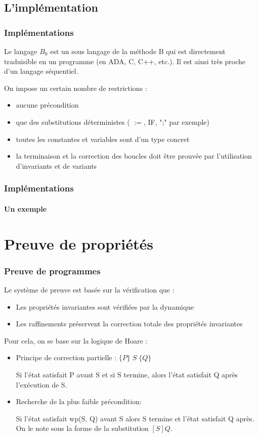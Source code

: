 \documentclass[11pt,a4paper,xcolor=table]{beamer} %
\begin{document}
\subsection{L'implémentation}
\begin{frame}
\frametitle{Implémentations}
Le langage $B_0$ est un sous langage de la méthode B qui est directement traduisible en un programme (en ADA, C, C++, etc.).  Il est ainsi très proche d'un langage séquentiel.

\pause

On impose un certain nombre de restrictions :
\begin{itemize}
\item aucune précondition
\item que des substitutions déterministes ( $:=$, \textsc{IF}, ";" par exemple)
\item toutes les constantes et variables sont d'un type concret
\item la terminaison et la correction des boucles doit être prouvée par l'utilisation d'invariants et de variants
\end{itemize}

\end{frame}

\begin{frame}
\frametitle{Implémentations}
\framesubtitle{Un exemple}
\end{frame}

\section{Preuve de propriétés}
\begin{frame}
\frametitle{Preuve de programmes}
Le système de preuve est basée sur la vérification que :
\begin{itemize}
\item Les propriétés invariantes sont vérifiées par la
dynamique
\item Les raffinements préservent la correction totale
des propriétés invariantes
\end{itemize}

\pause
Pour cela, on se base sur la logique de Hoare :
\begin{itemize}
\item
Principe de correction partielle : $ \{P\}\;S\;\{Q\} $ 

Si l'état satisfait P avant S et si S termine, alors l'état satisfait Q après l'exécution de S.
\item
Recherche de la plus faible précondition:

Si l'état satisfait wp(S, Q) avant S alors S termine et l'état satisfait Q après.
On le note sous la forme de la substitution $[S]Q$.
\end{itemize}
\end{frame}
\end{document}
